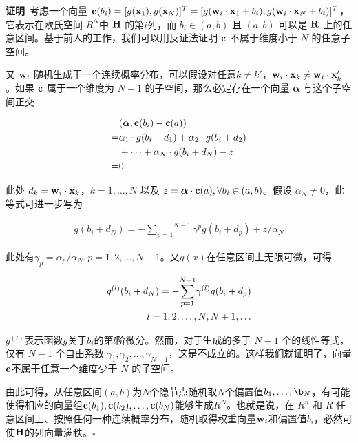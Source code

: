 \documentclass[conference]{IEEEtran}
\begin{document}
\textbf{证明}\ 考虑一个向量 ${\bf c}(b_i)=[g({\bf x}_1),g({\bf x}_N)]^T=[g({\bf w}_i\cdot{\bf x}_1+b_i),g({\bf w}_i\cdot{\bf x}_N+b_i)]^T$，它表示在欧氏空间 $R^N$中 ${\bf H}$ 的第$i$列，而 $b_i\in(a,b)$ 且 $(a,b)$ 可以是 ${\bf R}$ 上的任意区间。基于前人的工作，我们可以用反证法证明 ${\bf c}$ 不属于维度小于 $N$ 的任意子空间。

又 ${\bf w}_i$ 随机生成于一个连续概率分布，可以假设对任意$k\ne k'$，${\bf w}_i\cdot {\bf x}_k \ne {\bf w}_i\cdot {\bf x}_k'$。如果 ${\bf c}$ 属于一个维度为 $N-1$ 的子空间，那么必定存在一个向量 ${\bm \alpha}$ 与这个子空间正交

\begin{align}\label{eq6}
	&({\bm \alpha},{\bf c}(b_i)-{\bf c}(a))\notag\\
	=&{\alpha}_1\cdot g(b_i+d_1)+{\alpha}_2\cdot g(b_i+d_2)\notag\\
	&+\dots+{\alpha}_N\cdot g(b_i+d_N)-z\notag\\
	=&0
\end{align}

此处 $d_k={\bf w}_i\cdot{\bf x}_k$，$k=1,\dots,N$ 以及 $z={\bm \alpha}\cdot{\bf c}(a), \forall b_i\in(a,b)$。假设 $\alpha_N\ne0$，此等式可进一步写为

\begin{align}\label{eq7}
	g(b_i+d_N)=-\overset{N-1} {\underset {p=1}\sum}\gamma^p g(b_i+d_p)+z/\alpha_N
\end{align}

此处有$\gamma_p=\alpha_p/\alpha_N, p=1,2,\dots,N-1$。又$g(x)$在任意区间上无限可微，可得

\begin{align}\label{eq8}
	g^{(l)}(b_i+d_N)=-\overset{N-1} {\underset {p=1}\sum}\gamma^{(l)} g(b_i+d_p)\notag\\
	l=1,2,\dots,N,N+1,\dots
\end{align}

$g^{(l)}$表示函数$g$关于$b_i$的第$l$阶微分。然而，对于生成的多于 $N-1$ 个的线性等式，仅有 $N-1$ 个自由系数 $\gamma_1,\gamma_2,\dots,\gamma_{N-1}$，这是不成立的。这样我们就证明了，向量${\bf c}$不属于任意一个维度少于 $N$ 的子空间。

由此可得，从任意区间$(a,b)$为$N$个隐节点随机取$N$个偏置值$b_1,\dots,\b_N$，有可能使得相应的向量组${\bf c}(b_1),{\bf c}(b_2),\dots,{\bf c}(b_N)$能够生成$R^N$。也就是说，在 $R^n$ 和 $R$ 任意区间上、按照任何一种连续概率分布，随机取得权重向量${\bf w}_i$和偏置值$b_i$，必然可使${\bf H}$的列向量满秩。$\square$
\end{document}
